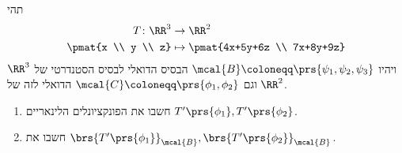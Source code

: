 \documentclass[a4paper,10pt,twoside,openany]{book}
\begin{document}
\begin{exercisechap}
תהי
\begin{align*}
T \colon \RR^3 &\to \RR^2 \\
\pmat{x \\ y \\ z} &\mapsto \pmat{4x+5y+6z \\ 7x+8y+9z}
\end{align*}
ויהיו
$\mcal{B} \coloneqq \prs{\psi_1, \psi_2, \psi_3}$
הבסיס הדואלי לבסיס הסטנדרטי של
$\RR^3$
וגם
$\mcal{C} \coloneqq \prs{\phi_1, \phi_2}$
הדואלי לזה של
$\RR^2$.

\begin{enumerate}
\item חשבו את הפונקציונלים הלינאריים
$T'\prs{\phi_1}, T'\prs{\phi_2}$.

\item חשבו את
$\brs{T'\prs{\phi_1}}_\mcal{B}, \brs{T'\prs{\phi_2}}_\mcal{B}$.
\end{enumerate}
\end{exercisechap}
\end{document}
